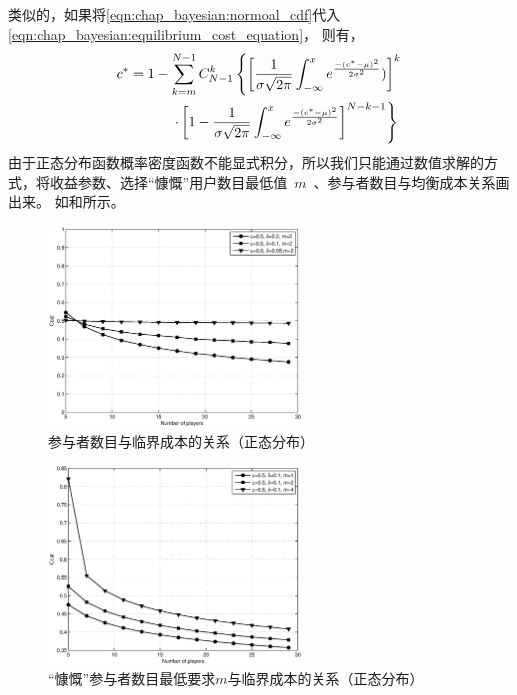 类似的，如果将\eqref{eqn:chap_bayesian:normoal_cdf}代入\eqref{eqn:chap_bayesian:equilibrium_cost_equation}，
则有，
\begin{align} 
    c^* &= 1- \sum_{k=m}^{N-1}C_{N-1}^k \left\{\left[ \frac{1}{\sigma \sqrt{2\pi} } \int^x_{-\infty}e^{ \frac{-(c^*-\mu)^2}{2\sigma^2}})\right]^k \right. \notag \\
    & \qquad \left. \quad \cdot \left[1- \frac{1}{\sigma \sqrt{2\pi} } \int^x_{-\infty}e^{ \frac{-(c^*-\mu)^2}{2\sigma^2}}\right]^{N-k-1} \right\}
     \label{eqn:chap_bayesian:cost_normal_distribution_equation}
\end{align}
由于正态分布函数概率密度函数不能显式积分，所以我们只能通过数值求解的方式，将收益参数、选择“慷慨”用户数目最低值~$m$~、参与者数目与均衡成本关系画出来。
如和所示。
\begin{figure}[tb]
\begin{centering}
\includegraphics[width=0.6\textwidth]{bayesian_normal_user_number_vs_contribute_probability.eps}
\caption{参与者数目与临界成本的关系（正态分布）}
\label{fig:bayesian_normal_user_numb_vs_contr_prob}
\end{centering}
\end{figure}
\begin{figure}[!tb]
\begin{centering}
\includegraphics[width=0.6\textwidth]{bayesian_normal_punish_parameter_vs_contribute_probability.eps}
\caption{“慷慨”参与者数目最低要求$m$与临界成本的关系（正态分布）}
\label{fig:bayesian_normal_puni_para_vs_cont_prob}
\end{centering}
\end{figure}

